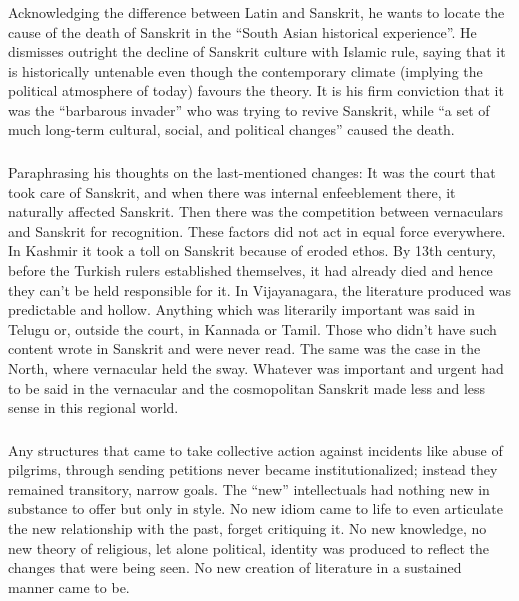 \subsubsection{} Acknowledging the difference between Latin and Sanskrit, he wants to locate the cause of the death of Sanskrit in the “South Asian historical experience”. He dismisses outright the decline of Sanskrit culture with Islamic rule, saying that it is historically untenable even though the contemporary climate (implying the political atmosphere of today) favours the theory. It is his firm conviction that it was the “barbarous invader” who was trying to revive Sanskrit, while “a set of much long-term cultural, social, and political changes” caused the death.

\subsubsection{} Paraphrasing his thoughts on the last-mentioned changes: It was the court that took care of Sanskrit, and when there was internal enfeeblement there, it naturally affected Sanskrit. Then there was the competition between vernaculars and Sanskrit for recognition. These factors did not act in equal force everywhere. In Kashmir it took a toll on Sanskrit because of eroded ethos. By 13th century, before the Turkish rulers established themselves, it had already died and hence they can’t be held responsible for it. In Vijayanagara, the literature produced was predictable and hollow. Anything which was literarily important was said in Telugu or, outside the court, in Kannada or Tamil. Those who didn’t have such content wrote in Sanskrit and were never read. The same was the case in the North, where vernacular held the sway. Whatever was important and urgent had to be said in the vernacular and the cosmopolitan Sanskrit made less and less sense in this regional world.

\subsubsection{} Any structures that came to take collective action against incidents like abuse of pilgrims, through sending petitions never became institutionalized; instead they remained transitory, narrow goals. The “new” intellectuals had nothing new in substance to offer but only in style. No new idiom came to life to even articulate the new relationship with the past, forget critiquing it. No new knowledge, no new theory of religious, let alone political, identity was produced to reflect the changes that were being seen. No new creation of literature in a sustained manner came to be. 


